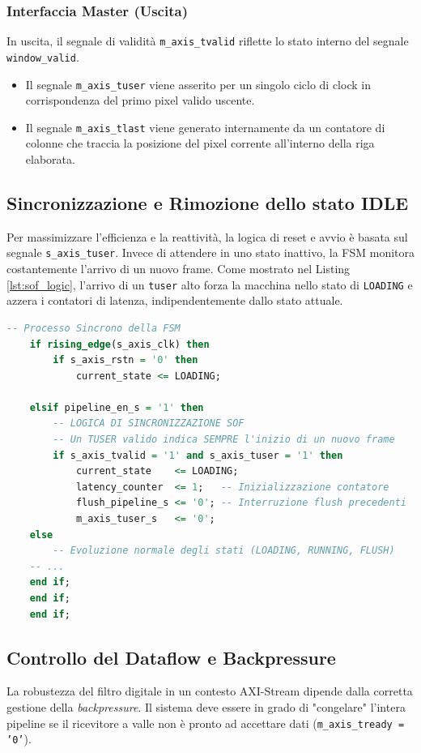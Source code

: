 \subsubsection{Interfaccia Master (Uscita)}
In uscita, il segnale di validità \texttt{m\_axis\_tvalid} riflette lo stato interno del segnale \texttt{window\_valid}.
\begin{itemize}
	\item Il segnale \texttt{m\_axis\_tuser} viene asserito per un singolo ciclo di clock in corrispondenza del primo pixel valido uscente.
	\item Il segnale \texttt{m\_axis\_tlast} viene generato internamente da un contatore di colonne che traccia la posizione del pixel corrente all'interno della riga elaborata.
\end{itemize}

\subsection{Sincronizzazione e Rimozione dello stato IDLE}
Per massimizzare l'efficienza e la reattività, la logica di reset e avvio è basata sul segnale \texttt{s\_axis\_tuser}. Invece di attendere in uno stato inattivo, la FSM monitora costantemente l'arrivo di un nuovo frame.
Come mostrato nel Listing \ref{lst:sof_logic}, l'arrivo di un \texttt{tuser} alto forza la macchina nello stato di \texttt{LOADING} e azzera i contatori di latenza, indipendentemente dallo stato attuale.

\begin{lstlisting}[language=VHDL, caption={Gestione sincrona del SOF e reset implicito}, label={lst:sof_logic}]
	-- Processo Sincrono della FSM
	if rising_edge(s_axis_clk) then
		if s_axis_rstn = '0' then
			current_state <= LOADING;
	
	elsif pipeline_en_s = '1' then
		-- LOGICA DI SINCRONIZZAZIONE SOF
		-- Un TUSER valido indica SEMPRE l'inizio di un nuovo frame
		if s_axis_tvalid = '1' and s_axis_tuser = '1' then
			current_state    <= LOADING;
			latency_counter  <= 1;   -- Inizializzazione contatore
			flush_pipeline_s <= '0'; -- Interruzione flush precedenti
			m_axis_tuser_s   <= '0';
	else
		-- Evoluzione normale degli stati (LOADING, RUNNING, FLUSH)
	-- ...
	end if;
	end if;
	end if;
\end{lstlisting}

\subsection{Controllo del Dataflow e Backpressure}
La robustezza del filtro digitale in un contesto AXI-Stream dipende dalla corretta gestione della \textit{backpressure}. Il sistema deve essere in grado di "congelare" l'intera pipeline se il ricevitore a valle non è pronto ad accettare dati (\texttt{m\_axis\_tready = '0'}).

